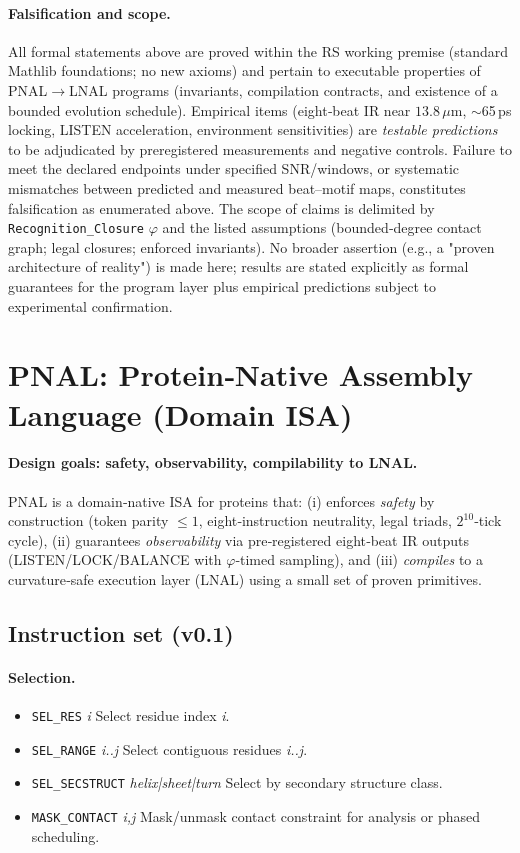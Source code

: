 \documentclass[12pt,a4paper]{article}
\begin{document}
\paragraph{Falsification and scope.}
All formal statements above are proved within the RS working premise (standard Mathlib foundations; no new axioms) and pertain to executable properties of PNAL$\to$LNAL programs (invariants, compilation contracts, and existence of a bounded evolution schedule). Empirical items (eight‑beat IR near $13.8\,\mu$m, $\sim$65\,ps locking, LISTEN acceleration, environment sensitivities) are \emph{testable predictions} to be adjudicated by preregistered measurements and negative controls. Failure to meet the declared endpoints under specified SNR/windows, or systematic mismatches between predicted and measured beat–motif maps, constitutes falsification as enumerated above. The scope of claims is delimited by \texttt{Recognition\_Closure} $\varphi$ and the listed assumptions (bounded‑degree contact graph; legal closures; enforced invariants). No broader assertion (e.g., a "proven architecture of reality") is made here; results are stated explicitly as formal guarantees for the program layer plus empirical predictions subject to experimental confirmation.

\section{PNAL: Protein‑Native Assembly Language (Domain ISA)}

\paragraph{Design goals: safety, observability, compilability to LNAL.}
PNAL is a domain‑native ISA for proteins that:
(i) enforces \emph{safety} by construction (token parity $\le 1$, eight‑instruction neutrality, legal triads, $2^{10}$‑tick cycle),
(ii) guarantees \emph{observability} via pre‑registered eight‑beat IR outputs (LISTEN/LOCK/BALANCE with $\varphi$‑timed sampling),
and (iii) \emph{compiles} to a curvature‑safe execution layer (LNAL) using a small set of proven primitives.

\subsection{Instruction set (v0.1)}
\paragraph{Selection.}
\begin{itemize}
  \item \texttt{SEL\_RES} \textit{i} \quad Select residue index \textit{i}.
  \item \texttt{SEL\_RANGE} \textit{i..j} \quad Select contiguous residues \textit{i..j}.
  \item \texttt{SEL\_SECSTRUCT} \textit{helix|sheet|turn} \quad Select by secondary structure class.
  \item \texttt{MASK\_CONTACT} \textit{i,j} \quad Mask/unmask contact constraint for analysis or phased scheduling.
\end{itemize}
\end{document}
